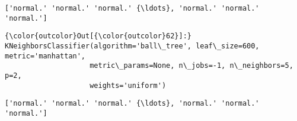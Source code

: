 \documentclass[11pt]{article}
\begin{document}
    \begin{Verbatim}[commandchars=\\\{\}]
['normal.' 'normal.' 'normal.' {\ldots}, 'normal.' 'normal.' 'normal.']

    \end{Verbatim}

\begin{Verbatim}[commandchars=\\\{\}]
{\color{outcolor}Out[{\color{outcolor}62}]:} KNeighborsClassifier(algorithm='ball\_tree', leaf\_size=600, metric='manhattan',
                    metric\_params=None, n\_jobs=-1, n\_neighbors=5, p=2,
                    weights='uniform')
\end{Verbatim}
            
    \begin{Verbatim}[commandchars=\\\{\}]
['normal.' 'normal.' 'normal.' {\ldots}, 'normal.' 'normal.' 'normal.']

    \end{Verbatim}
\end{document}
